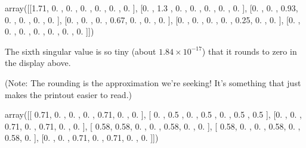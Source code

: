 \documentclass[letterpaper,10pt,english]{jupyterBook}
\begin{document}
\begin{sphinxVerbatim}[commandchars=\\\{\}]
     
   
     
\end{sphinxVerbatim}

\begin{sphinxVerbatim}[commandchars=\\\{\}]
array([[1.71, 0.  , 0.  , 0.  , 0.  , 0.  , 0.  ],
       [0.  , 1.3 , 0.  , 0.  , 0.  , 0.  , 0.  ],
       [0.  , 0.  , 0.93, 0.  , 0.  , 0.  , 0.  ],
       [0.  , 0.  , 0.  , 0.67, 0.  , 0.  , 0.  ],
       [0.  , 0.  , 0.  , 0.  , 0.25, 0.  , 0.  ],
       [0.  , 0.  , 0.  , 0.  , 0.  , 0.  , 0.  ]])
\end{sphinxVerbatim}

\sphinxAtStartPar
The sixth singular value is so tiny (about \(1.84\times10^{-17}\)) that it rounds to zero in the display above.

\sphinxAtStartPar
(Note: The rounding is  the approximation we’re seeking!  It’s something that just makes the printout easier to read.)

\begin{sphinxVerbatim}[commandchars=\\\{\}]
       
\end{sphinxVerbatim}

\begin{sphinxVerbatim}[commandchars=\\\{\}]
array([[ 0.71, \PYGZhy{}0.  , \PYGZhy{}0.  , \PYGZhy{}0.  ,  0.71, \PYGZhy{}0.  ,  0.  ],
       [ 0.  ,  0.5 ,  0.  ,  0.5 ,  0.  ,  0.5 ,  0.5 ],
       [\PYGZhy{}0.  , \PYGZhy{}0.  ,  0.71, \PYGZhy{}0.  ,  0.71, \PYGZhy{}0.  ,  0.  ],
       [ 0.58,  0.58, \PYGZhy{}0.  ,  0.  ,  0.58,  0.  ,  0.  ],
       [ 0.58,  0.  , \PYGZhy{}0.  ,  0.58, \PYGZhy{}0.  ,  0.58,  0.  ],
       [\PYGZhy{}0.  , \PYGZhy{}0.  ,  0.71, \PYGZhy{}0.  ,  0.71, \PYGZhy{}0.  , \PYGZhy{}0.  ]])
\end{sphinxVerbatim}
\end{document}
